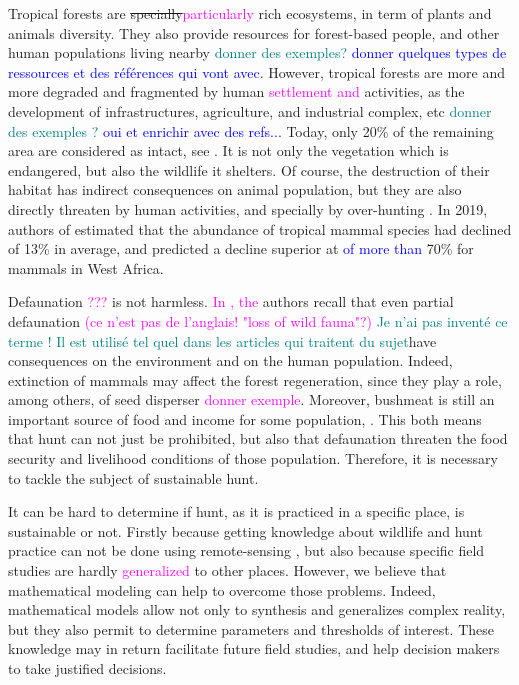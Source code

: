 \documentclass{article}
\newcommand{\marc}[1]{\textcolor{teal}{#1}}
\newcommand{\YD}[1]{\textcolor{magenta}{#1}}
\newcommand{\VY}[1]{\textcolor{blue}{#1}}
\begin{document}
Tropical forests are \sout{specially}\YD{particularly} rich ecosystems, in term of plants and animals diversity. They also provide resources for forest-based people, and other human populations living nearby \marc{donner des exemples?} \VY{donner quelques types de ressources et des références qui vont avec}. However, tropical forests are more and more degraded and fragmented by human \YD{settlement and }activities, as the development of infrastructures, agriculture, and industrial complex, etc \marc{donner des exemples ?} \VY{oui et enrichir avec des refs..}. Today, only 20\% of the remaining area are considered as intact, see \cite{benitez-lopez_intact_2019}. It is not only the vegetation which is endangered, but also the wildlife it shelters. Of course, the destruction of their habitat has indirect consequences on animal population, but they are also directly threaten by human activities, and specially by over-hunting \cite{wilkie_empty_2011, benitez-lopez_intact_2019}. In 2019, authors of \cite{benitez-lopez_intact_2019} estimated that the abundance of tropical mammal species had declined of 13\% in average, and predicted a decline superior at \VY{of more than} 70\% for mammals in West Africa. 

Defaunation \YD{???} is not harmless. \YD{In \cite{ripple_bushmeat_2016}, the }authors recall that even partial defaunation \YD{(ce n'est pas de l'anglais! "loss of wild fauna"?)} \marc{Je n'ai pas inventé ce terme ! Il est utilisé tel quel dans les articles qui traitent du sujet}have consequences on the environment and on the human population. Indeed, extinction of mammals may affect the forest regeneration, since they play a role, among others, of seed disperser \YD{donner exemple}. Moreover, bushmeat is still an important source of food and income for some population, \cite{jones_incentives_2019}. This both means that hunt can not just be prohibited, but also that defaunation threaten the food security and livelihood conditions of those population. Therefore, it is necessary to tackle the subject of sustainable hunt.

It can be hard to determine if hunt, as it is practiced in a specific place, is sustainable or not. Firstly because getting knowledge about wildlife and hunt practice can not be done using remote-sensing \cite{peres_detecting_2006}, but also because specific field studies are hardly \YD{generalized} to other places. However, we believe that mathematical modeling can help to overcome those problems. Indeed, mathematical models allow not only to synthesis and generalizes complex reality, but they also permit to determine parameters and thresholds of interest. These knowledge may in return facilitate future field studies, and help decision makers to take justified decisions.
\end{document}
